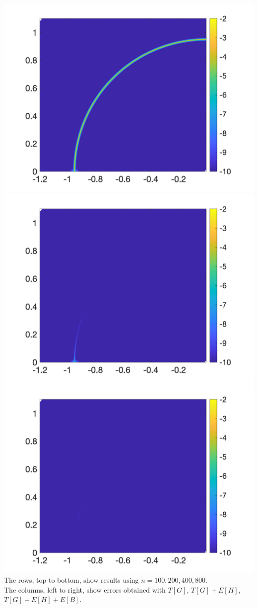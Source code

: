 \includegraphics[trim=40 20 40 10, clip, width=2.5truein]{figs/fig800a} 
\includegraphics[trim=40 20 40 10, clip, width=2.5truein]{figs/fig800b} 
\includegraphics[trim=40 20 40 10, clip, width=2.5truein]{figs/fig800c} 
\vfill
\noindent
The rows, top to bottom, show results using $n=100,200,400,800$.\\
The columns, left to right, show errors obtained with $T[G]$, $T[G]+E[H]$, $T[G]+E[H]+E[B]$.

